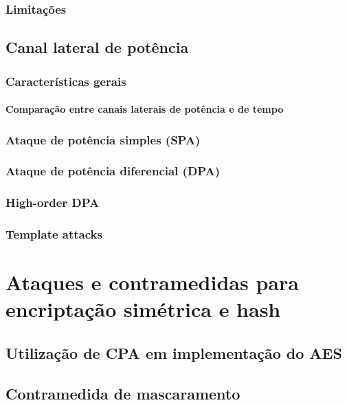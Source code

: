 \documentclass[12pt]{article}
\begin{document}
\subsubsection{Limitações}

\subsection{Canal lateral de potência}

\subsubsection{Características gerais}

\paragraph{Comparação entre canais laterais de potência e de tempo}

\subsubsection{Ataque de potência simples (SPA)}

\subsubsection{Ataque de potência diferencial (DPA)}

\subsubsection{High-order DPA}

\subsubsection{Template attacks}

\section{Ataques e contramedidas para encriptação simétrica e hash}

\subsection{Utilização de CPA em implementação do AES}

\subsection{Contramedida de mascaramento}
\end{document}

